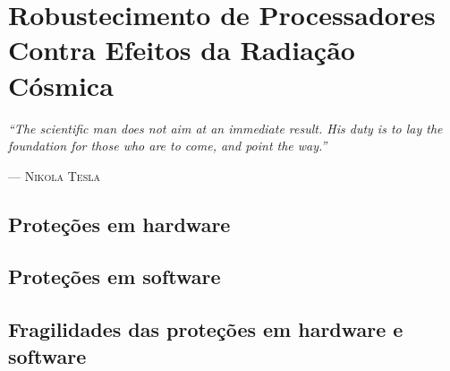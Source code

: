 \chapter{Robustecimento de Processadores Contra Efeitos da Radiação Cósmica}

\epigraph{\sffamily\itshape
``The scientific man does not aim at an immediate result. His duty is to lay the foundation for those who are to come, and point the way.''}{--- \textsc{Nikola Tesla}}



\section{Proteções em hardware}
\section{Proteções em software}
\section{Fragilidades das proteções em hardware e software}